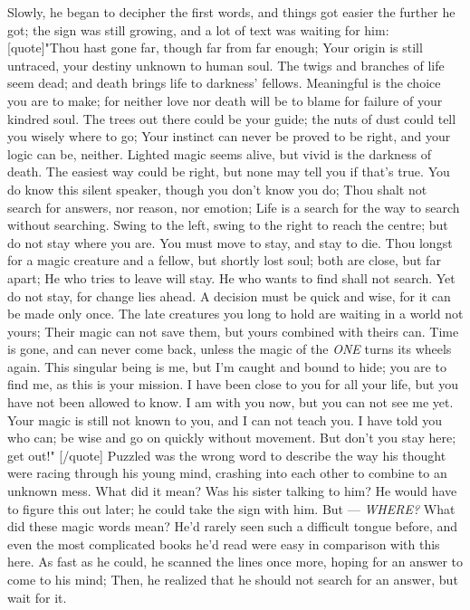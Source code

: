 Slowly, he began to decipher the first words, and things got easier the further he got; the sign was still growing, and a lot of text was waiting for him:
[quote]"Thou hast gone far, 
though far from far enough; 
Your origin is still untraced, 
your destiny unknown to human soul. 
The twigs and branches of life seem dead; 
and death brings life to darkness' fellows. 
Meaningful is the choice you are to make; 
for neither love nor death will be to blame 
for failure of your kindred soul. 
The trees out there could be your guide; 
the nuts of dust could tell you wisely 
where to go; 
Your instinct can never be proved to be right, 
and your logic can be, neither. 
Lighted magic seems alive, 
but vivid is the darkness of death. 
The easiest way could be right, 
but none may tell you if that's true. 
You do know this silent speaker, 
though you don't know you do; 
Thou shalt not search for answers, 
nor reason, nor emotion; 
Life is a search for the way 
to search without searching. 
Swing to the left, swing to the right 
to reach the centre; 
but do not stay where you are. 
You must move to stay, 
and stay to die. 
Thou longst for a magic creature 
and a fellow, but shortly lost soul; 
both are close, but far apart; 
He who tries to leave will stay. 
He who wants to find shall not search. 
Yet do not stay, for change lies ahead. 
A decision must be quick and wise, 
for it can be made only once. 
The late creatures you long to hold are waiting 
in a world not yours; 
Their magic can not save them, 
but yours combined with theirs can. 
Time is gone, 
and can never come back, 
unless the magic of the \emph{ONE} 
turns its wheels again. 
This singular being is me, 
but I'm caught and bound to hide; 
you are to find me, 
as this is your mission. 
I have been close to you for all your life, 
but you have not been allowed to know. 
I am with you now, 
but you can not see me yet. 
Your magic is still not known to you, 
and I can not teach you. 
I have told you who can; 
be wise and go on quickly 
without movement. 
But don't you stay here; 
get out!" 
[/quote]
Puzzled was the wrong word to describe the way his thought were racing through his young mind, crashing into each other to combine to an unknown mess. 
What did it mean? Was his sister talking to him? 
He would have to figure this out later; he could take the sign with him. But --- \emph{WHERE?} 
What did these magic words mean? He'd rarely seen such a difficult tongue before, and even the most complicated books he'd read were easy in comparison with this here. 
As fast as he could, he scanned the lines once more, hoping for an answer to come to his mind; Then, he realized that he should not search for an answer, but wait for it. 
